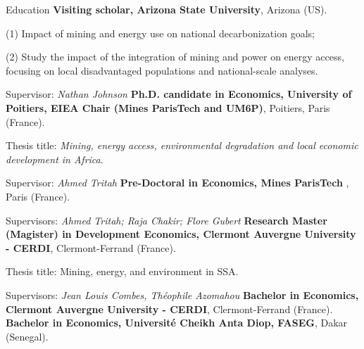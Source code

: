 \begin{rubric}{\small Education}
%
	\textbf{Visiting scholar, Arizona State University}, Arizona (US).
  \par 
 (1) Impact of mining and energy use on national decarbonization goals; 

(2) Study the impact of the integration of mining and power on energy access, focusing on local disadvantaged populations and national-scale analyses.\par
Supervisor: \emph{Nathan Johnson} 
\entry*[2021 -- present]%
	\textbf{Ph.D. candidate in Economics, University of Poitiers, EIEA Chair (Mines ParisTech and UM6P)}, Poitiers, Paris (France).
	\par Thesis title: \emph{Mining, energy access, environmental degradation and local economic development in Africa}. \par
  \par Supervisor: \emph{Ahmed Tritah} 
\entry*[2020 -- 2021]%
	\textbf{Pre-Doctoral in Economics, Mines ParisTech} , Paris (France).\par
 Supervisors: \emph{Ahmed Tritah; Raja Chakir; Flore Gubert} 
\entry*[2018 -- 2020]%
	\textbf{Research Master (Magister) in Development Economics, Clermont Auvergne University -
CERDI}, Clermont-Ferrand (France).\par
	Thesis title: Mining, energy, and environment in SSA.
  \par Supervisors: \emph{Jean Louis Combes, Théophile Azomahou}
\entry*[2017 -- 2018]%
	\textbf{Bachelor in Economics, Clermont Auvergne University -
CERDI}, Clermont-Ferrand (France).
	 \entry*[2014 -- 2017]%
	\textbf{Bachelor in Economics, Université Cheikh Anta Diop, FASEG}, Dakar (Senegal).	
\end{rubric}








